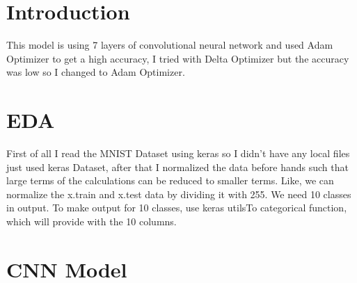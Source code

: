\documentclass[fleqn,10pt]{SelfArx} %
\affiliation{\textsuperscript{1}\textit{MIU, Computer Science}} %
\begin{document}
\maketitle %

\tableofcontents %

\thispagestyle{empty} %


\section*{Introduction} %


This model is using 7 layers of convolutional neural network and used Adam Optimizer to get a high accuracy, I tried with Delta Optimizer but the accuracy was low so I changed to Adam Optimizer.

\section{EDA}



First of all I read the MNIST Dataset using keras so I didn't have any local files just used keras Dataset, after that I normalized the data before hands such that large terms of the calculations can be reduced to smaller terms. Like, we can normalize the x.train and x.test data by dividing it with 255. We need 10 classes in output. To make output for 10 classes, use keras utilsTo categorical function, which will provide with the 10 columns. 


\section{CNN Model}
\end{document}
